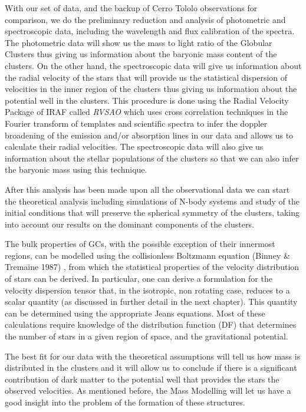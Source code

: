 With our set of data, and the backup of Cerro Tololo observations for comparison, we do the preliminary reduction and analysis of photometric and spectroscopic data, including the wavelength and flux calibration of the spectra. The photometric data will show us the mass to light ratio of the Globular Clusters thus giving us information about the baryonic mass content of the clusters. On the other hand, the spectroscopic data will give us information about the radial velocity of the stars that will provide us the statistical dispersion of velocities in the inner region of the clusters thus giving us information about the potential well in the clusters.  This procedure is done using the Radial Velocity Package of IRAF called \textit{RVSAO} which uses cross correlation techniques in the Fourier transform of templates and scientific spectra to infer the doppler broadening of the emission and/or absorption lines in our data and allows us to calculate their radial velocities. The spectroscopic data will also give us information about the stellar populations of the clusters so that we can also infer the baryonic mass using this technique. 

After this analysis has been made upon all the observational data we can start the theoretical analysis including simulations of N-body systems and study of the initial conditions that will preserve the spherical symmetry of the clusters, taking into account our results on the dominant components of the clusters. 

The bulk properties of GCs, with the possible exception of their innermost regions, can be modelled using the collisionless Boltzmann equation (Binney \& Tremaine 1987) \cite{3}, from which the statistical properties of the velocity distribution of stars can be derived. In particular, one can derive a formulation for the velocity dispersion tensor that, in the isotropic, non rotating case, reduces to a scalar quantity (as discussed in further detail in the next chapter). This quantity can be determined using the appropriate Jeans equations. Most of these calculations require knowledge of the distribution function (DF) that determines the number of stars in a given region of space, and the gravitational potential.

The best fit for our data with the theoretical assumptions will tell us how mass is distributed in the clusters and it will allow us to conclude if there is a significant contribution of dark matter to the potential well that provides the stars the observed velocities. As mentioned before, the Mass Modelling will let us have a good insight into the problem of the formation of these structures.


